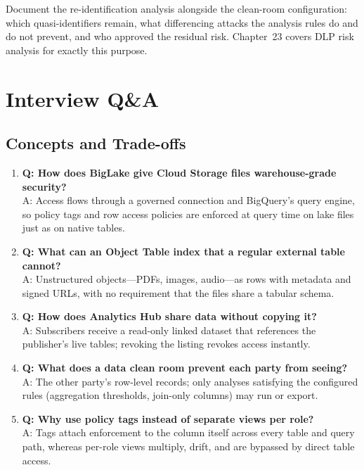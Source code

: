 \begin{tipbox}
Document the re-identification analysis alongside the clean-room configuration: which quasi-identifiers remain, what differencing attacks the analysis rules do and do not prevent, and who approved the residual risk. Chapter~23 covers DLP risk analysis for exactly this purpose.
\end{tipbox}

\section{Interview Q\&A}
\subsection{Concepts and Trade-offs}
\begin{enumerate}
    \item \textbf{Q: How does BigLake give Cloud Storage files warehouse-grade security?}\\
    A: Access flows through a governed connection and BigQuery's query engine, so policy tags and row access policies are enforced at query time on lake files just as on native tables.

    \item \textbf{Q: What can an Object Table index that a regular external table cannot?}\\
    A: Unstructured objects---PDFs, images, audio---as rows with metadata and signed URLs, with no requirement that the files share a tabular schema.

    \item \textbf{Q: How does Analytics Hub share data without copying it?}\\
    A: Subscribers receive a read-only linked dataset that references the publisher's live tables; revoking the listing revokes access instantly.

    \item \textbf{Q: What does a data clean room prevent each party from seeing?}\\
    A: The other party's row-level records; only analyses satisfying the configured rules (aggregation thresholds, join-only columns) may run or export.

    \item \textbf{Q: Why use policy tags instead of separate views per role?}\\
    A: Tags attach enforcement to the column itself across every table and query path, whereas per-role views multiply, drift, and are bypassed by direct table access.
\end{enumerate}

